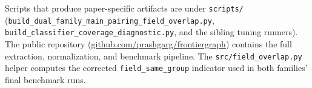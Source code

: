 \documentclass[11pt]{article}
\newcommand{\repoURL}{\href{https://github.com/prashgarg/frontiergraph}{github.com/prashgarg/frontiergraph}}
\begin{document}
Scripts that produce paper-specific artifacts are under \texttt{scripts/}
(\texttt{build\_dual\_family\_main\_pairing\_field\_overlap.py},
\texttt{build\_classifier\_coverage\_diagnostic.py}, and the sibling tuning
runners). The public repository (\repoURL) contains the full extraction,
normalization, and benchmark pipeline. The \texttt{src/field\_overlap.py} helper
computes the corrected \texttt{field\_same\_group} indicator used in both
families' final benchmark runs.



\end{document}
